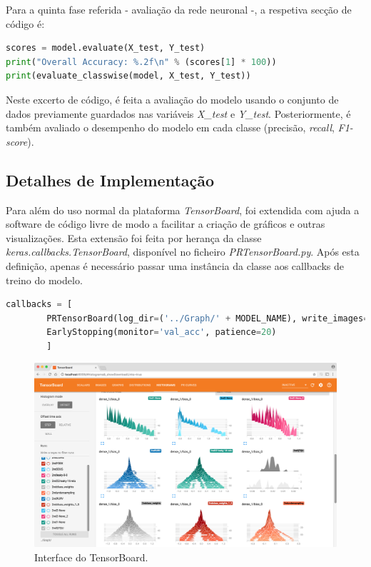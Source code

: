 \documentclass[]{article}
\begin{document}
Para a quinta fase referida - avaliação da rede neuronal -, a respetiva secção de código é:
\begin{lstlisting}[language=python]
scores = model.evaluate(X_test, Y_test)
print("Overall Accuracy: %.2f\n" % (scores[1] * 100))
print(evaluate_classwise(model, X_test, Y_test))
\end{lstlisting}
Neste excerto de código, é feita a avaliação do modelo usando o conjunto de dados previamente guardados nas variáveis \textit{X\_test} e \textit{Y\_test}. Posteriormente, é também avaliado o desempenho do modelo em cada classe (precisão, \textit{recall}, \textit{F1-score}).

\subsection{Detalhes de Implementação}
Para além do uso normal da plataforma \textit{TensorBoard}, foi extendida com ajuda a software de código livre de modo a facilitar a criação de gráficos e outras visualizações. Esta extensão foi feita por herança da classe \textit{keras.callbacks.TensorBoard}, disponível no ficheiro \textit{PRTensorBoard.py}. Após esta definição, apenas é necessário passar uma instância da classe aos callbacks de treino do modelo.

\begin{lstlisting}[language=python]
callbacks = [
        PRTensorBoard(log_dir=('../Graph/' + MODEL_NAME), write_images=True, histogram_freq=5),
        EarlyStopping(monitor='val_acc', patience=20)
        ]
\end{lstlisting}

\begin{figure}[h!]
\centering
\includegraphics[scale=0.25]{img/tensorboard.png}
\caption{Interface do TensorBoard.}
\label{fig:tensorboard}
\end{figure}
\end{document}
